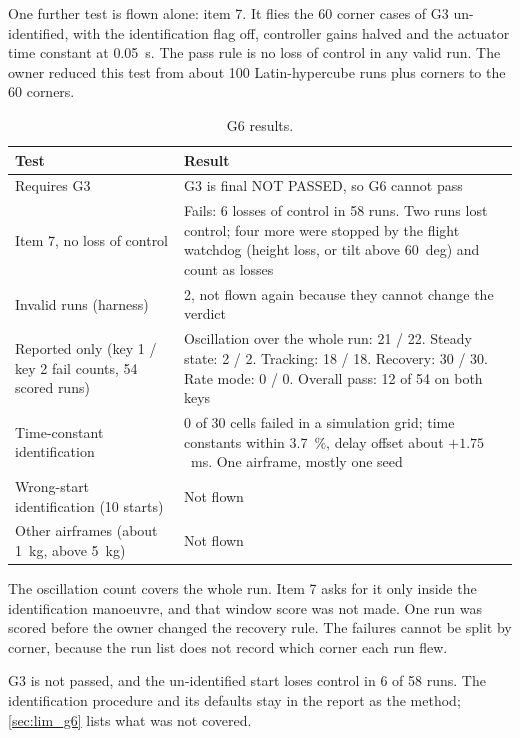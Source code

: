 One further test is flown alone: item 7.
It flies the 60 corner cases of G3 un-identified, with the identification flag off, controller gains halved and the actuator time constant at 0.05~s.
The pass rule is no loss of control in any valid run.
The owner reduced this test from about 100 Latin-hypercube runs plus corners to the 60 corners.

\begin{table}[tbp]
\caption{G6 results.}\label{tab:val_g6}
\centering
\small
\begin{tabularx}{\textwidth}{@{}L{4.8cm} Y@{}}
\toprule
Test & Result \\
\midrule
Requires G3 & G3 is final NOT PASSED, so G6 cannot pass \\
Item 7, no loss of control & Fails: 6 losses of control in 58 runs. Two runs lost control; four more were stopped by the flight watchdog (height loss, or tilt above 60~deg) and count as losses \\
Invalid runs (harness) & 2, not flown again because they cannot change the verdict \\
Reported only (key 1 / key 2 fail counts, 54 scored runs) & Oscillation over the whole run: 21 / 22. Steady state: 2 / 2. Tracking: 18 / 18. Recovery: 30 / 30. Rate mode: 0 / 0. Overall pass: 12 of 54 on both keys \\
Time-constant identification & 0 of 30 cells failed in a simulation grid; time constants within 3.7~\%, delay offset about $+1.75$~ms. One airframe, mostly one seed \\
Wrong-start identification (10 starts) & Not flown \\
Other airframes (about 1~kg, above 5~kg) & Not flown \\
\bottomrule
\end{tabularx}
\end{table}

The oscillation count covers the whole run.
Item 7 asks for it only inside the identification manoeuvre, and that window score was not made.
One run was scored before the owner changed the recovery rule.
The failures cannot be split by corner, because the run list does not record which corner each run flew.

\begin{keyresult}
G3 is not passed, and the un-identified start loses control in 6 of 58 runs.
The identification procedure and its defaults stay in the report as the method; \cref{sec:lim_g6} lists what was not covered.
\end{keyresult}

